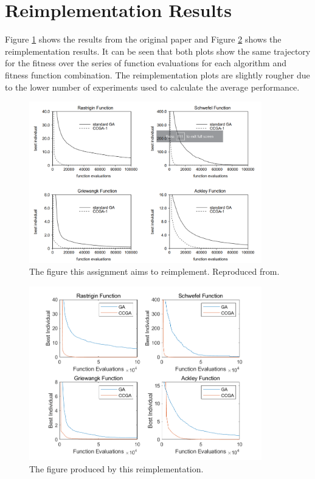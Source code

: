 \section{Reimplementation Results} \label{sec:reimplementation-results}

Figure \ref{fig:original_plot} shows the results from the original paper and Figure \ref{fig:combined_plot} shows the reimplementation results.
It can be seen that both plots show the same trajectory for the fitness over the series of function evaluations for each algorithm and fitness function combination.
The reimplementation plots are slightly rougher due to the lower number of experiments used to calculate the average performance. 

\begin{figure}[ht!]
    \centering 
    \includegraphics[width=0.9\textwidth]{img/original_plot.png}
    \caption{The figure this assignment aims to reimplement. Reproduced from\cite{original-paper}.}
    \label{fig:original_plot}
  \end{figure}

\begin{figure}[ht!]
    \centering 
    \includegraphics[width=0.9\textwidth]{img/combined_plot.png}
    \caption{The figure produced by this reimplementation.}
    \label{fig:combined_plot}
\end{figure}

